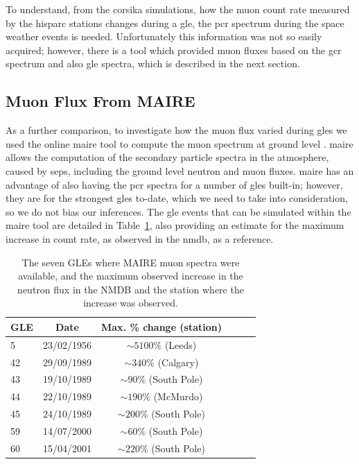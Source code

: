 To understand, from the \gls{corsika} simulations, how the muon count rate measured by the \gls{hisparc} stations changes during a \gls{gle}, the \gls{pcr} spectrum during the space weather events is needed. Unfortunately this information was not so easily acquired; however, there is a tool which provided muon fluxes based on the \gls{gcr} spectrum and also \gls{gle} spectra, which is described in the next section.



\subsection{Muon Flux From MAIRE}\label{sec:MAIRE_flux}

As a further comparison, to investigate how the muon flux varied during \glspl{gle} we used the online \gls{maire} tool to compute the muon spectrum at ground level \citep{dyer_calculations_2003, lei_atmospheric_2004}. \gls{maire} allows the computation of the secondary particle spectra in the atmosphere, caused by \glspl{sep}, including the ground level neutron and muon fluxes. \gls{maire} has an advantage of also having the \gls{pcr} spectra for a number of \glspl{gle} built-in; however, they are for the strongest \glspl{gle} to-date, which we need to take into consideration, so we do not bias our inferences. The \gls{gle} events that can be simulated within the \gls{maire} tool are detailed in Table~\ref{tab:MAIRE_GLEs}, also providing an estimate for the maximum increase in count rate, as observed in the \gls{nmdb}, as a reference.

\vspace{1em}

\begin{table}[ht!]
	\begin{center}
		\caption{The seven GLEs where MAIRE muon spectra were available, and the maximum observed increase in the neutron flux in the NMDB and the station where the increase was observed.}
		\label{tab:MAIRE_GLEs}
		\begin{tabular}{l c c c c c}
			\hline
			{\bf GLE} & {\bf Date} & {\bf Max. \% change (station)} \\
			\hline
			5  & 23/02/1956 & $\sim 5100\%$ (Leeds) \\
			42 & 29/09/1989 & $\sim 340\%$ (Calgary) \\
			43 & 19/10/1989 & $\sim 90\%$ (South Pole) \\
			44 & 22/10/1989 & $\sim 190\%$ (McMurdo) \\
			45 & 24/10/1989 & $\sim 200\%$ (South Pole) \\
			59 & 14/07/2000 & $\sim 60\%$ (South Pole) \\
			60 & 15/04/2001 & $\sim 220\%$ (South Pole) \\
			\hline
		\end{tabular}
	\end{center}
\end{table}

